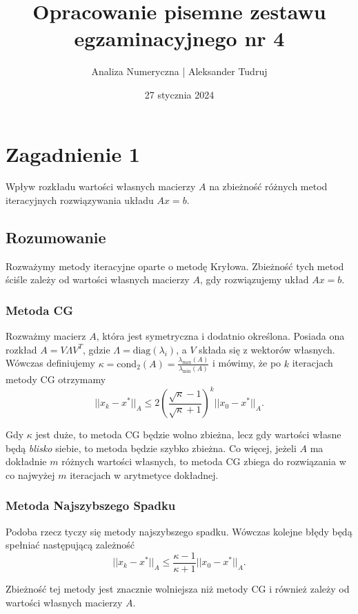 \documentclass[a4paper,12pt]{article}
\title{ Opracowanie pisemne zestawu egzaminacyjnego nr 4 }
\author{ Analiza Numeryczna | Aleksander Tudruj }
\date{ 27 stycznia 2024 }
\newcommand{\lmax}[1]{\lambda_{\text{max}}(#1)}
\newcommand{\lmin}[1]{\lambda_{\text{min}}(#1)}
\newcommand{\condtwo}[1]{\text{cond}_2(#1)}
\begin{document}
\maketitle

\section*{Zagadnienie 1}
Wpływ rozkładu wartości własnych macierzy $A$ na zbieżność różnych metod iteracyjnych rozwiązywania układu $Ax = b$.

\subsection*{Rozumowanie}

Rozważymy metody iteracyjne oparte o metodę Kryłowa. Zbieżność
tych metod ściśle zależy od wartości własnych macierzy $A$, gdy rozwiązujemy
układ $Ax = b$.

\subsubsection*{Metoda CG}

Rozważmy macierz $A$, która jest symetryczna i dodatnio określona.
Posiada ona rozkład $A = V \Lambda V^T$, gdzie $\Lambda = \text{diag}(\lambda_i)$,
a $V$ składa się z wektorów własnych.
Wówczas definiujemy $\kappa = \condtwo{A} = \frac{\lmax{A}}{\lmin{A}}$
i mówimy, że po $k$ iteracjach metody CG otrzymamy
$$
    ||x_k - x^*||_A \leq 2 \left( \frac{\sqrt{\kappa} - 1}{\sqrt{\kappa} + 1} \right)^k ||x_0 - x^*||_A.
$$

Gdy $\kappa$ jest duże, to metoda CG będzie wolno zbieżna, lecz gdy wartości własne
będą \textit{blisko} siebie, to metoda będzie szybko zbieżna. Co więcej,
jeżeli $A$ ma dokładnie $m$ różnych wartości własnych, to metoda CG zbiega
do rozwiązania w co najwyżej $m$ iteracjach w arytmetyce dokładnej.

\subsubsection*{Metoda Najszybszego Spadku}

Podoba rzecz tyczy się metody najszybszego spadku. Wówczas kolejne błędy będą spełniać
następującą zależność
$$
    ||x_k - x^*||_A \leq \frac{\kappa - 1}{\kappa + 1} ||x_0 - x^*||_A.
$$

Zbieżność tej metody jest znacznie wolniejsza niż metody CG i również zależy od
wartości własnych macierzy $A$.
\end{document}
